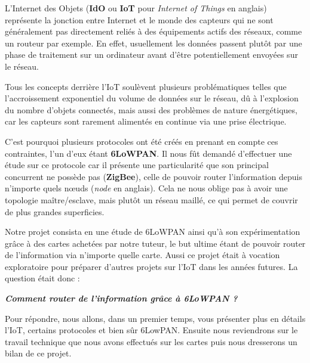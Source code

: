 
L'Internet des Objets (\textbf{IdO} ou \textbf{IoT} pour \textit{Internet of Things} en anglais) représente la jonction entre Internet et le monde des capteurs qui ne sont généralement pas directement reliés à des équipements actifs des réseaux, comme un routeur par exemple. En effet, usuellement les données passent plutôt par une phase de traitement sur un ordinateur avant d'être potentiellement envoyées sur le réseau.

Tous les concepts derrière l'IoT soulèvent plusieurs problématiques telles que l'accroissement exponentiel du volume de données sur le réseau, dû à l'explosion du nombre d'objets connectés, mais aussi des problèmes de nature énergétiques, car les capteurs sont rarement alimentés en continue via une prise électrique.

C'est pourquoi plusieurs protocoles ont été créés en prenant en compte ces contraintes, l'un d'eux étant \textbf{6LoWPAN}. Il nous fût demandé d'effectuer une étude sur ce protocole car il présente une particularité que son principal concurrent ne possède pas (\textbf{ZigBee}), celle de pouvoir router l'information depuis n'importe quels nœuds (\textit{node} en anglais). Cela ne nous oblige pas à avoir une topologie maître/esclave, mais plutôt un réseau maillé, ce qui permet de couvrir de plus grandes superficies.

Notre projet consista en une étude de 6LoWPAN ainsi qu'à son expérimentation grâce à des cartes achetées par notre tuteur, le but ultime étant de pouvoir router de l'information via n'importe quelle carte. Aussi ce projet était à vocation exploratoire pour préparer d'autres projets sur l'IoT dans les années futures. La question était donc :

\begin{center}
\textbf{\textit{Comment router de l'information grâce à 6LoWPAN ?}}
\end{center}

Pour répondre, nous allons, dans un premier temps, vous présenter plus en détails l'IoT, certains protocoles et bien sûr 6LowPAN. Ensuite nous reviendrons sur le travail technique que nous avons effectués sur les cartes puis nous dresserons un bilan de ce projet.
